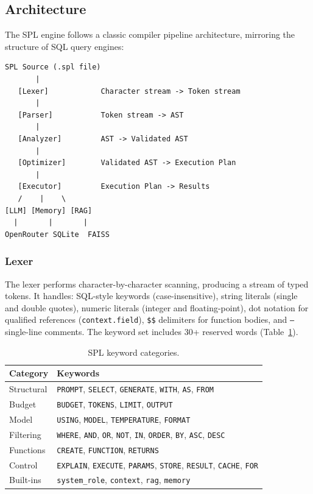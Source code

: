 \documentclass[11pt,a4paper]{article}
\begin{document}
\subsection{Architecture}

The SPL engine follows a classic compiler pipeline architecture, mirroring the structure of SQL query engines:

\begin{verbatim}
SPL Source (.spl file)
       |
   [Lexer]            Character stream -> Token stream
       |
   [Parser]           Token stream -> AST
       |
   [Analyzer]         AST -> Validated AST
       |
   [Optimizer]        Validated AST -> Execution Plan
       |
   [Executor]         Execution Plan -> Results
   /    |    \
[LLM] [Memory] [RAG]
  |       |       |
OpenRouter SQLite  FAISS
\end{verbatim}

\subsubsection{Lexer}

The lexer performs character-by-character scanning, producing a stream of typed tokens. It handles: SQL-style keywords (case-insensitive), string literals (single and double quotes), numeric literals (integer and floating-point), dot notation for qualified references (\texttt{context.field}), \texttt{\$\$} delimiters for function bodies, and \texttt{--} single-line comments. The keyword set includes 30+ reserved words (Table~\ref{tab:keywords}).

\begin{table}[h]
\centering
\caption{SPL keyword categories.}
\label{tab:keywords}
\begin{tabular}{@{}lp{10cm}@{}}
\toprule
\textbf{Category} & \textbf{Keywords} \\
\midrule
Structural & \texttt{PROMPT}, \texttt{SELECT}, \texttt{GENERATE}, \texttt{WITH}, \texttt{AS}, \texttt{FROM} \\
Budget & \texttt{BUDGET}, \texttt{TOKENS}, \texttt{LIMIT}, \texttt{OUTPUT} \\
Model & \texttt{USING}, \texttt{MODEL}, \texttt{TEMPERATURE}, \texttt{FORMAT} \\
Filtering & \texttt{WHERE}, \texttt{AND}, \texttt{OR}, \texttt{NOT}, \texttt{IN}, \texttt{ORDER}, \texttt{BY}, \texttt{ASC}, \texttt{DESC} \\
Functions & \texttt{CREATE}, \texttt{FUNCTION}, \texttt{RETURNS} \\
Control & \texttt{EXPLAIN}, \texttt{EXECUTE}, \texttt{PARAMS}, \texttt{STORE}, \texttt{RESULT}, \texttt{CACHE}, \texttt{FOR} \\
Built-ins & \texttt{system\_role}, \texttt{context}, \texttt{rag}, \texttt{memory} \\
\bottomrule
\end{tabular}
\end{table}
\end{document}
